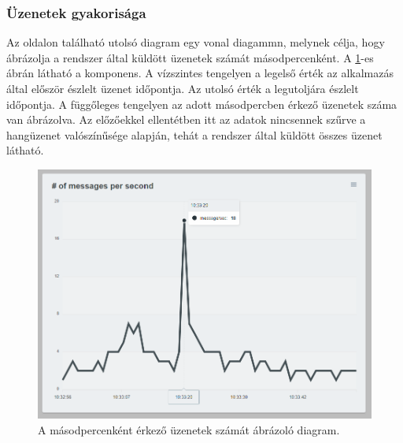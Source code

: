 \subsubsection{Üzenetek gyakorisága}
Az oldalon található utolsó diagram egy vonal diagammn, melynek célja, hogy ábrázolja a rendszer által küldött üzenetek számát másodpercenként.
A \ref{fig:dashboard-messages-line}-es ábrán látható a komponens.
A vízszintes tengelyen a legelső érték az alkalmazás által először észlelt üzenet időpontja.
Az utolsó érték a legutoljára észlelt időpontja.
A függőleges tengelyen az adott másodpercben érkező üzenetek száma van ábrázolva.
Az előzőekkel ellentétben itt az adatok nincsennek szűrve a hangüzenet valószínűsége alapján,
tehát a rendszer által küldött összes üzenet látható.
\begin{figure}[!ht]
    \centering
    \includegraphics[width=150mm, keepaspectratio]{figures/dashboard-line-messages.png}
    \caption{A másodpercenként érkező üzenetek számát ábrázoló diagram.}
    \label{fig:dashboard-messages-line}
\end{figure}
\newpage
